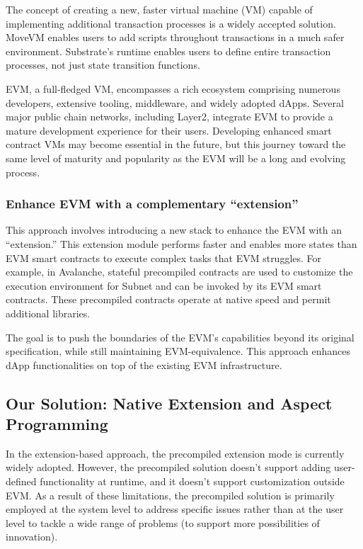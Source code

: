 The concept of creating a new, faster virtual machine (VM) capable of implementing additional transaction processes is a widely accepted solution. MoveVM enables users to add scripts throughout transactions in a much safer environment. Substrate's runtime enables users to define entire transaction processes, not just state transition functions.

EVM, a full-fledged VM, encompasses a rich ecosystem comprising numerous developers, extensive tooling, middleware, and widely adopted dApps. Several major public chain networks, including Layer2, integrate EVM to provide a mature development experience for their users. Developing enhanced smart contract VMs may become essential in the future, but this journey toward the same level of maturity and popularity as the EVM will be a long and evolving process.

\subsubsection{Enhance EVM with a complementary “extension”}

This approach involves introducing a new stack to enhance the EVM with an “extension.” This extension module performs faster and enables more states than EVM smart contracts to execute complex tasks that EVM struggles. For example, in Avalanche, stateful precompiled contracts are used to customize the execution environment for Subnet and can be invoked by its EVM smart contracts. These precompiled contracts operate at native speed and permit additional libraries.

The goal is to push the boundaries of the EVM’s capabilities beyond its original specification, while still maintaining EVM-equivalence. This approach enhances dApp functionalities on top of the existing EVM infrastructure.

\subsection{Our Solution: Native Extension and Aspect Programming}

In the extension-based approach, the precompiled extension mode is currently widely adopted. However, the precompiled solution doesn’t support adding user-defined functionality at runtime, and it doesn't support customization outside EVM. As a result of these limitations, the precompiled solution is primarily employed at the system level to address specific issues rather than at the user level to tackle a wide range of problems (to support more possibilities of innovation).

